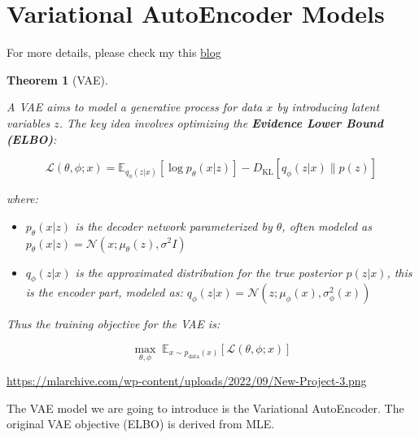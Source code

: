 \documentclass[
  12pt,
]{article}
\providecommand{\tightlist}{%
  \setlength{\itemsep}{0pt}\setlength{\parskip}{0pt}}\usepackage{longtable,booktabs,array}
\theoremstyle{plain}
\newtheorem{theorem}{Theorem}[section]
\theoremstyle{remark}
\begin{document}
\section{Variational AutoEncoder
Models}\label{variational-autoencoder-models}

For more details, please check my this
\href{https://yyzhang2000.github.io/Blog/posts/Generative\%20Model/VAE.html}{blog}

\begin{theorem}[VAE]\protect\hypertarget{thm-vae}{}\label{thm-vae}

A VAE aims to model a generative process for data \(x\) by introducing
latent variables \(z\). The key idea involves optimizing the
\textbf{Evidence Lower Bound (ELBO)}:

\[
\mathcal{L}(\theta, \phi; x) = \mathbb{E}_{q_{\phi}(z|x)}[\log p_{\theta}(x|z)] - D_{\text{KL}}\left[q_{\phi}(z|x) \| p(z)\right]
\]

where:

\begin{itemize}
\tightlist
\item
  \(p_\theta(x | z)\) is the decoder network parameterized by
  \(\theta\), often modeled as
  \(p_\theta(x | z) = \mathcal{N}(x; \mu_\theta(z), \sigma^2I)\)
\item
  \(q_\phi(z|x)\) is the approximated distribution for the true
  posterior \(p(z|x)\), this is the encoder part, modeled as:
  \(q_\phi(z | x) = \mathcal{N}(z; \mu_\phi(x), \sigma_\phi^2(x))\)
\end{itemize}

Thus the training objective for the VAE is:

\[
\max_{\theta, \phi}\; \mathbb{E}_{x \sim p_{\text{data}}(x)}[\mathcal{L}(\theta, \phi; x)]
\]

\end{theorem}

\url{https://mlarchive.com/wp-content/uploads/2022/09/New-Project-3.png}

The VAE model we are going to introduce is the Variational AutoEncoder.
The original VAE objective (ELBO) is derived from MLE.
\end{document}
